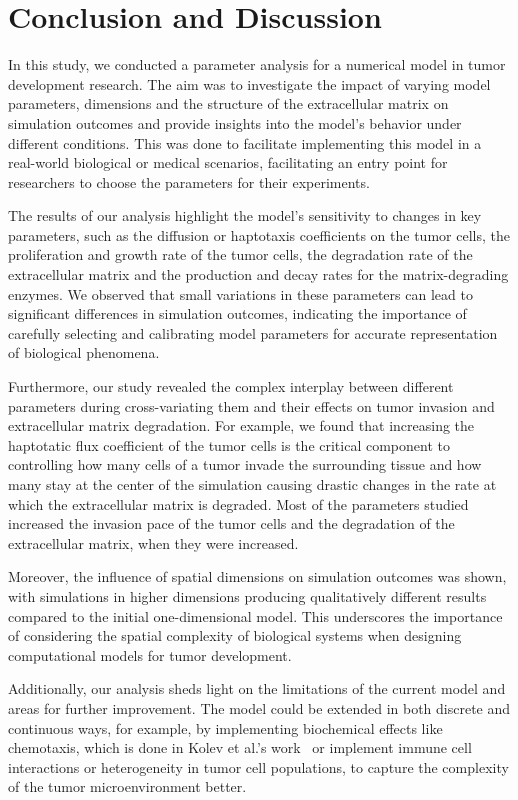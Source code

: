 \section{Conclusion and Discussion}
In this study, we conducted a parameter analysis for a numerical model in tumor development research. The aim was to investigate the impact of varying model parameters, dimensions and the structure of the extracellular matrix on simulation outcomes and provide insights into the model's behavior under different conditions. This was done to facilitate implementing this model in a real-world biological or medical scenarios, facilitating an entry point for researchers to choose the parameters for their experiments.

The results of our analysis highlight the model's sensitivity to changes in key parameters, such as the diffusion or haptotaxis coefficients on the tumor cells, the proliferation and growth rate of the tumor cells, the degradation rate of the extracellular matrix and the production and decay rates for the matrix-degrading enzymes. We observed that small variations in these parameters can lead to significant differences in simulation outcomes, indicating the importance of carefully selecting and calibrating model parameters for accurate representation of biological phenomena.

Furthermore, our study revealed the complex interplay between different parameters during cross-variating them and their effects on tumor invasion and extracellular matrix degradation. For example, we found that increasing the haptotatic flux coefficient of the tumor cells is the critical component to controlling how many cells of a tumor invade the surrounding tissue and how many stay at the center of the simulation causing drastic changes in the rate at which the extracellular matrix is degraded. Most of the parameters studied increased the invasion pace of the tumor cells and the degradation of the extracellular matrix, when they were increased.

Moreover, the influence of spatial dimensions on simulation outcomes was shown, with simulations in higher dimensions producing qualitatively different results compared to the initial one-dimensional model. This underscores the importance of considering the spatial complexity of biological systems when designing computational models for tumor development.

Additionally, our analysis sheds light on the limitations of the current model and areas for further improvement. The model could be extended in both discrete and continuous ways, for example, by implementing biochemical effects like chemotaxis, which is done in Kolev et al.'s work~\cite{Kolev2010} or implement immune cell interactions or heterogeneity in tumor cell populations, to capture the complexity of the tumor microenvironment better.

